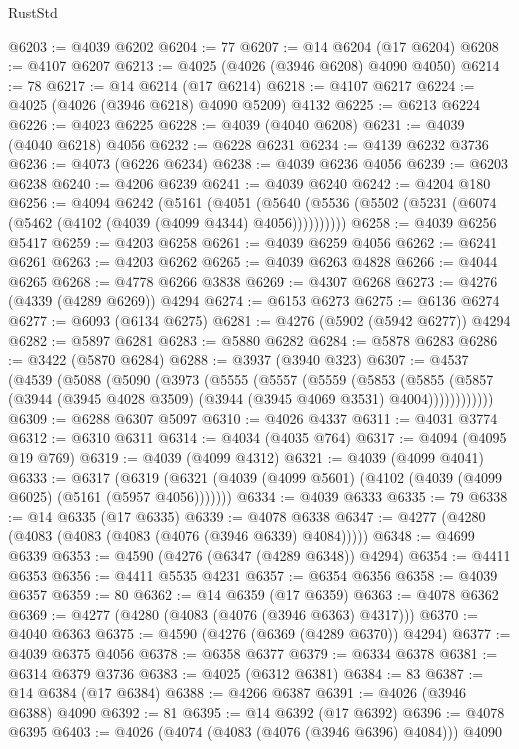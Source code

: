 \begin{lexlean}{RustStd}
\begin{coremodule}
@6203 := @4039 @6202
@6204 := 77
@6207 := @14 @6204 (@17 @6204)
@6208 := @4107 @6207
@6213 := @4025 (@4026 (@3946 @6208) @4090 @4050)
@6214 := 78
@6217 := @14 @6214 (@17 @6214)
@6218 := @4107 @6217
@6224 := @4025 (@4026 (@3946 @6218) @4090 @5209) @4132
@6225 := @6213 @6224
@6226 := @4023 @6225
@6228 := @4039 (@4040 @6208)
@6231 := @4039 (@4040 @6218) @4056
@6232 := @6228 @6231
@6234 := @4139 @6232 @3736
@6236 := @4073 (@6226 @6234)
@6238 := @4039 @6236 @4056
@6239 := @6203 @6238
@6240 := @4206 @6239
@6241 := @4039 @6240
@6242 := @4204 @180
@6256 := @4094
    @6242
    (@5161
      (@4051 (@5640 (@5536 (@5502 (@5231 (@6074 (@5462 (@4102 (@4039 (@4099 @4344) @4056))))))))))
@6258 := @4039 @6256 @5417
@6259 := @4203 @6258
@6261 := @4039 @6259 @4056
@6262 := @6241 @6261
@6263 := @4203 @6262
@6265 := @4039 @6263 @4828
@6266 := @4044 @6265
@6268 := @4778 @6266 @3838
@6269 := @4307 @6268
@6273 := @4276 (@4339 (@4289 @6269)) @4294
@6274 := @6153 @6273
@6275 := @6136 @6274
@6277 := @6093 (@6134 @6275)
@6281 := @4276 (@5902 (@5942 @6277)) @4294
@6282 := @5897 @6281
@6283 := @5880 @6282
@6284 := @5878 @6283
@6286 := @3422 (@5870 @6284)
@6288 := @3937 (@3940 @323)
@6307 := @4537
    (@4539
      (@5088
        (@5090
          (@3973
            (@5555
              (@5557
                (@5559
                  (@5853
                    (@5855
                      (@5857 (@3944 (@3945 @4028 @3509) (@3944 (@3945 @4069 @3531) @4004))))))))))))
@6309 := @6288 @6307 @5097
@6310 := @4026 @4337
@6311 := @4031 @3774
@6312 := @6310 @6311
@6314 := @4034 (@4035 @764)
@6317 := @4094 (@4095 @19 @769)
@6319 := @4039 (@4099 @4312)
@6321 := @4039 (@4099 @4041)
@6333 := @6317
    (@6319 (@6321 (@4039 (@4099 @5601) (@4102 (@4039 (@4099 @6025) (@5161 (@5957 @4056)))))))
@6334 := @4039 @6333
@6335 := 79
@6338 := @14 @6335 (@17 @6335)
@6339 := @4078 @6338
@6347 := @4277 (@4280 (@4083 (@4083 (@4083 (@4076 (@3946 @6339) @4084)))))
@6348 := @4699 @6339
@6353 := @4590 (@4276 (@6347 (@4289 @6348)) @4294)
@6354 := @4411 @6353
@6356 := @4411 @5535 @4231
@6357 := @6354 @6356
@6358 := @4039 @6357
@6359 := 80
@6362 := @14 @6359 (@17 @6359)
@6363 := @4078 @6362
@6369 := @4277 (@4280 (@4083 (@4076 (@3946 @6363) @4317)))
@6370 := @4040 @6363
@6375 := @4590 (@4276 (@6369 (@4289 @6370)) @4294)
@6377 := @4039 @6375 @4056
@6378 := @6358 @6377
@6379 := @6334 @6378
@6381 := @6314 @6379 @3736
@6383 := @4025 (@6312 @6381)
@6384 := 83
@6387 := @14 @6384 (@17 @6384)
@6388 := @4266 @6387
@6391 := @4026 (@3946 @6388) @4090
@6392 := 81
@6395 := @14 @6392 (@17 @6392)
@6396 := @4078 @6395
@6403 := @4026 (@4074 (@4083 (@4076 (@3946 @6396) @4084))) @4090

\end{coremodule}
\end{lexlean}
